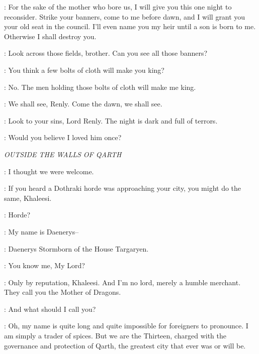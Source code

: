 \STANNIS: For the sake of the mother who bore us, I will give you this one night to reconsider. Strike your banners, come to me before dawn, and I will grant you your old seat in the council. I'll even name you my heir until a son is born to me. Otherwise I shall destroy you. 

\RENLY: Look across those fields, brother. Can you see all those banners? 

\STANNIS: You think a few bolts of cloth will make you king? 

\RENLY: No. The men holding those bolts of cloth will make me king. 

\STANNIS: We shall see, Renly. Come the dawn, we shall see. 

\MELISANDRE: Look to your sins, Lord Renly. The night is dark and full of terrors. 


\RENLY: Would you believe I loved him once? 



\scene

\textit{OUTSIDE THE WALLS OF QARTH}


\DAENERYS: I thought we were welcome. 

\JORAH: If you heard a Dothraki horde was approaching your city, you might do the same, Khaleesi. 

\DAENERYS: Horde? 



\DAENERYS: My name is Daenerys-- 

\SPICEKING:  Daenerys Stormborn of the House Targaryen. 

\DAENERYS: You know me, My Lord?

\SPICEKING: Only by reputation, Khaleesi. And I'm no lord, merely a humble merchant. They call you the Mother of Dragons. 

\DAENERYS: And what should I call you? 

\SPICEKING: Oh, my name is quite long and quite impossible for foreigners to pronounce. I am simply a trader of spices. But we are the Thirteen, charged with the governance and protection of Qarth, the greatest city that ever was or will be. 

